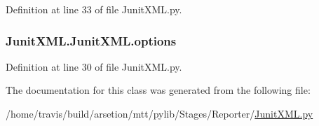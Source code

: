 Definition at line 33 of file Junit\-X\-M\-L.\-py.

\hypertarget{classJunitXML_1_1JunitXML_a7fad493a74a8051511f76e4edde36a76}{
\subsubsection[{options}]{\setlength{\rightskip}{0pt plus 5cm}Junit\-X\-M\-L.\-Junit\-X\-M\-L.\-options}}\label{classJunitXML_1_1JunitXML_a7fad493a74a8051511f76e4edde36a76}


Definition at line 30 of file Junit\-X\-M\-L.\-py.



The documentation for this class was generated from the following file\-:\begin{DoxyCompactItemize}
\item 
/home/travis/build/arsetion/mtt/pylib/\-Stages/\-Reporter/\hyperlink{JunitXML_8py}{Junit\-X\-M\-L.\-py}\end{DoxyCompactItemize}
